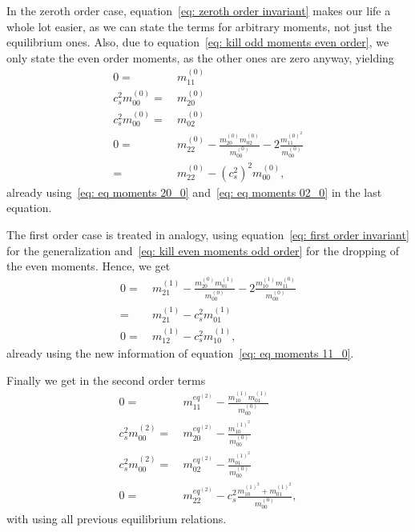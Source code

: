In the zeroth order case, equation~\eqref{eq: zeroth order invariant} makes our life a whole lot easier, as we can state the terms for arbitrary moments, not just the equilibrium ones.
Also, due to equation~\eqref{eq: kill odd moments even order}, we only state the even order moments, as the other ones are zero anyway, yielding
\begin{align}
  \label{eq: eq moments 11_0}
  0 = &\ m_{11}^{(0)}
  \\
  \label{eq: eq moments 20_0}
  c_s^2 m_{00}^{(0)} = &\ m_{20}^{(0)}
  \\
  \label{eq: eq moments 02_0}
  c_s^2 m_{00}^{(0)} = &\ m_{02}^{(0)}
  \\
  \label{eq: eq moments 22_0}
  0 = &\ m_{22}^{(0)} - \frac{ m_{20}^{(0)} m_{02}^{(0)} }{m_{00}^{(0)}} - 2\frac{ m_{11}^{{(0)}^2}}{m_{00}^{(0)}}
  \\ = &\ m_{22}^{(0)} - {(c_s^2)}^2 m_{00}^{(0)},
\end{align}
already using~\eqref{eq: eq moments 20_0} and~\eqref{eq: eq moments 02_0} in the last equation.

The first order case is treated in analogy, using equation~\eqref{eq: first order invariant} for the generalization and~\eqref{eq: kill even moments odd order} for the dropping of the even moments.
Hence, we get
\begin{align}\nonumber
  0 = &\ m_{21}^{(1)}
  - \frac{m_{20}^{(0)} m_{01}^{(1)}}{m_{00}^{(0)}}
  - 2\frac{m_{10}^{(1)} m_{11}^{(0)}}{m_{00}^{(0)}}
  \\
  \label{eq: eq moments 21_1}
  = &\ m_{21}^{(1)}
  - c_s^2 m_{01}^{(1)}
  \\
  \label{eq: eq moments 12_1}
  0 = &\ m_{12}^{(1)}
  - c_s^2 m_{10}^{(1)},
\end{align}
already using the new information of equation~\eqref{eq: eq moments 11_0}.

Finally we get in the second order terms
\begin{align}
    \label{eq: eq moments 11_2}
    0 =&\ m_{11}^{eq^{(2)}} - \frac{ m_{10}^{(1)} m_{01}^{(1)} }{ m_{00}^{(0)}}
    \\
    \label{eq: eq moments 20_2}
    c_s^2 m_{00}^{(2)} =&\ m_{20}^{eq^{(2)}} - \frac{ m_{10}^{{(1)}^2}}{m_{00}^{(0)}}
    \\
    \label{eq: eq moments 02_2}
    c_s^2 m_{00}^{(2)} =&\ m_{02}^{eq^{(2)}} - \frac{ m_{01}^{{(1)}^2}}{m_{00}^{(0)}}
    \\
    \label{eq: eq moments 22_2}
    0 = &\ m_{22}^{eq^{(2)}} - c_s^2 \frac{ m_{10}^{{(1)}^2}+m_{01}^{{(1)}^2}}{m_{00}^{(0)}},
\end{align}
with using all previous equilibrium relations.
